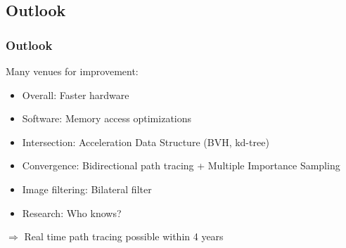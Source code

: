 \documentclass{beamer}
\begin{document}
\subsection{Outlook}
\begin{frame}
    \frametitle{Outlook}
    Many venues for improvement:
    \pause
    \begin{itemize}
        \item Overall: Faster hardware
        \pause
        \item Software: Memory access optimizations
        \pause
        \item Intersection: Acceleration Data Structure (BVH, kd-tree)
        \pause
        \item Convergence: Bidirectional path tracing + Multiple Importance Sampling
        \pause
        \item Image filtering: Bilateral filter
        \pause
        \item Research: Who knows?
    \end{itemize}
    \pause
    \(\Longrightarrow\) Real time path tracing possible within 4 years
\end{frame}
\end{document}
